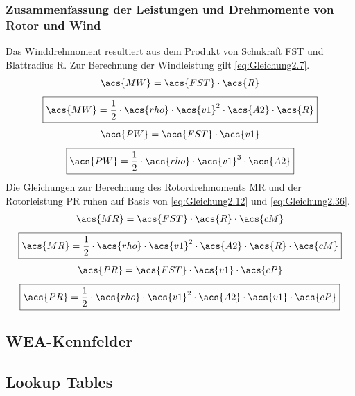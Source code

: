 \subsubsection{Zusammenfassung der Leistungen und Drehmomente von Rotor und Wind}
Das Winddrehmoment resultiert aus dem Produkt von Schukraft \acs{FST} und Blattradius \acs{R}. Zur Berechnung der Windleistung  gilt \autoref{eq:Gleichung2.7}.
\begin{align*}
    \acs{MW} = \acs{FST} \cdot \acs{R}
\end{align*}
\begin{equation}\label{eq:Gleichung2.37}
    \boxed{\acs{MW} = \frac{1}{2} \cdot \acs{rho} \cdot \acs{v1}^2 \cdot \acs{A2} \cdot \acs{R}}
\end{equation}
\newline
\begin{align*}
    \acs{PW} = \acs{FST} \cdot \acs{v1}
\end{align*}
\begin{equation}\label{eq:Gleichung2.38}
    \boxed{\acs{PW} = \frac{1}{2} \cdot \acs{rho} \cdot \acs{v1}^3 \cdot \acs{A2}}
\end{equation}
\newline
Die Gleichungen zur Berechnung des Rotordrehmoments \acs{MR} und der Rotorleistung \acs{PR} ruhen auf Basis von \autoref{eq:Gleichung2.12} und \autoref{eq:Gleichung2.36}.
\begin{align*}
    \acs{MR} = \acs{FST} \cdot \acs{R} \cdot \acs{cM}
\end{align*}
\begin{equation}\label{eq:Gleichung2.39}
    \boxed{\acs{MR} = \frac{1}{2} \cdot \acs{rho} \cdot \acs{v1}^2 \cdot \acs{A2} \cdot \acs{R} \cdot \acs{cM}}
\end{equation}
\newline
\begin{align*}
    \acs{PR} = \acs{FST} \cdot \acs{v1} \cdot \acs{cP}
\end{align*}
\begin{equation}\label{eq:Gleichung2.40}
    \boxed{\acs{PR} = \frac{1}{2} \cdot \acs{rho} \cdot \acs{v1}^2 \cdot \acs{A2} \cdot \acs{v1} \cdot \acs{cP}}
\end{equation}

\subsection{WEA-Kennfelder}

\subsection{Lookup Tables}
